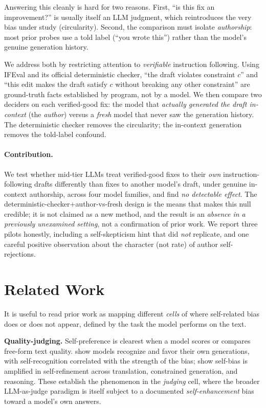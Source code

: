 \documentclass[11pt]{article}
\begin{document}
Answering this cleanly is hard for two reasons. First, ``is this fix an improvement?'' is
usually itself an LLM judgment, which reintroduces the very bias under study (circularity).
Second, the comparison must isolate \emph{authorship}: most prior probes use a told label
(``you wrote this'') rather than the model's genuine generation history.

We address both by restricting attention to \emph{verifiable} instruction following. Using
IFEval \citep{zhou2023instruction} and its official deterministic checker, ``the draft
violates constraint $c$'' and ``this edit makes the draft satisfy $c$ without breaking any
other constraint'' are ground-truth facts established by program, not by a model. We then
compare two deciders on each verified-good fix: the model that \emph{actually generated the
draft in-context} (the \emph{author}) versus a \emph{fresh} model that never saw the
generation history. The deterministic checker removes the circularity; the in-context
generation removes the told-label confound.

\paragraph{Contribution.} We test whether mid-tier LLMs treat verified-good fixes to their
\emph{own} instruction-following drafts differently than fixes to another model's draft,
under genuine in-context authorship, across four model families, and find \emph{no
detectable effect}. The deterministic-checker$+$author-vs-fresh design is the means that
makes this null credible; it is not claimed as a new method, and the result is an
\emph{absence in a previously unexamined setting}, not a confirmation of prior work. We
report three pilots honestly, including a self-skepticism hint that did \emph{not}
replicate, and one careful positive observation about the character (not rate) of author
self-rejections.

\section{Related Work}
\label{sec:related}

It is useful to read prior work as mapping different \emph{cells} of where self-related bias
does or does not appear, defined by the task the model performs on the text.

\textbf{Quality-judging.} Self-preference is clearest when a model scores or compares free-form
text quality. \citet{panickssery2024llm} show models recognize and favor their own generations,
with self-recognition correlated with the strength of the bias; \citet{xu2024pride} show
self-bias is amplified in self-refinement across translation, constrained generation, and
reasoning. These establish the phenomenon in the \emph{judging} cell, where the broader
LLM-as-judge paradigm \citep{zheng2023judging} is itself subject to a documented
\emph{self-enhancement} bias toward a model's own answers.
\end{document}
